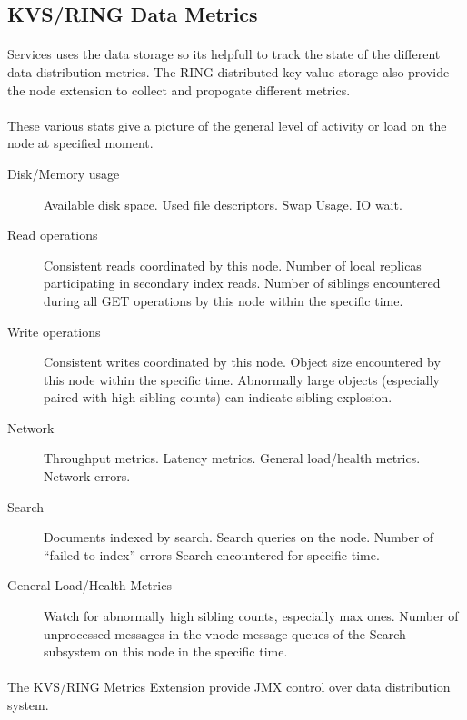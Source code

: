 \subsection*{KVS/RING Data Metrics}

\paragraph{}
Services uses the data storage so its helpfull to track the state of the different data distribution metrics.
The RING distributed key-value storage also provide the node extension to collect and propogate different metrics.

\paragraph{}
These various stats give a picture of the general level of activity or load on the node at specified moment.

\begin{description}
\item [Disk/Memory usage]
Available disk space. Used file descriptors. Swap Usage. IO wait.
\item [Read operations]
Consistent reads coordinated by this node. Number of local replicas participating in secondary index reads.
Number of siblings encountered during all GET operations by this node within the specific time.
\item [Write operations]
Consistent writes coordinated by this node.
Object size encountered by this node within the specific time.
Abnormally large objects (especially paired with high sibling counts) can indicate sibling explosion.
\item [Network]
Throughput metrics. Latency metrics. General load/health metrics. Network errors.
\item [Search]
Documents indexed by search. Search queries on the node. Number of “failed to index” errors Search encountered for specific time.
\item [General Load/Health Metrics]
Watch for abnormally high sibling counts, especially max ones.
Number of unprocessed messages in the vnode message queues of the Search subsystem on this node in the specific time.
\end{description}

\paragraph{}
The KVS/RING Metrics Extension provide JMX control over data distribution system.
